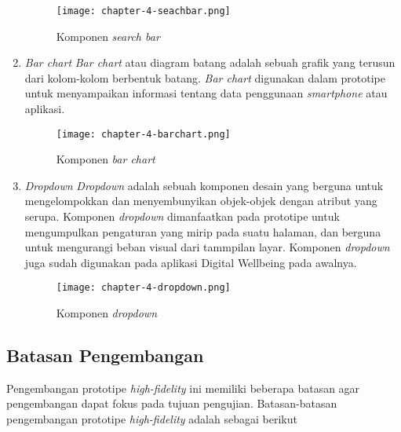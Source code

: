 \begin{enumerate}
  \begin{figure}[h]
    \centering
    \texttt{[image: chapter-4-seachbar.png]}
    \caption{Komponen \textit{search bar}}
    \label{img:searchbar}
  \end{figure}
  \FloatBarrier

  \item \textit{Bar chart}
  \subitem \textit{Bar chart} atau diagram batang adalah sebuah grafik yang terusun dari kolom-kolom berbentuk batang. \textit{Bar chart} digunakan dalam prototipe untuk menyampaikan informasi tentang data penggunaan \textit{smartphone} atau aplikasi.
 
  \begin{figure}[h]
    \centering
    \texttt{[image: chapter-4-barchart.png]}
    \caption{Komponen \textit{bar chart}}
    \label{img:barchart}
  \end{figure}
  \FloatBarrier

  \item \textit{Dropdown}
  \subitem \textit{Dropdown} adalah sebuah komponen desain yang berguna untuk mengelompokkan dan menyembunyikan objek-objek dengan atribut yang serupa. Komponen \textit{dropdown} dimanfaatkan pada prototipe untuk mengumpulkan pengaturan yang mirip pada suatu halaman, dan berguna untuk mengurangi beban visual dari tammpilan layar. Komponen \textit{dropdown} juga sudah digunakan pada aplikasi Digital Wellbeing pada awalnya.
 
  \begin{figure}[h]
    \centering
    \texttt{[image: chapter-4-dropdown.png]}
    \caption{Komponen \textit{dropdown}}
    \label{img:dropdown}
  \end{figure}
  \FloatBarrier

\end{enumerate}


\subsection{Batasan Pengembangan}
\label{subsec:hifi_1_batasan}

Pengembangan prototipe \textit{high-fidelity} ini memiliki beberapa batasan agar pengembangan dapat fokus pada tujuan pengujian. Batasan-batasan pengembangan prototipe \textit{high-fidelity} adalah sebagai berikut

